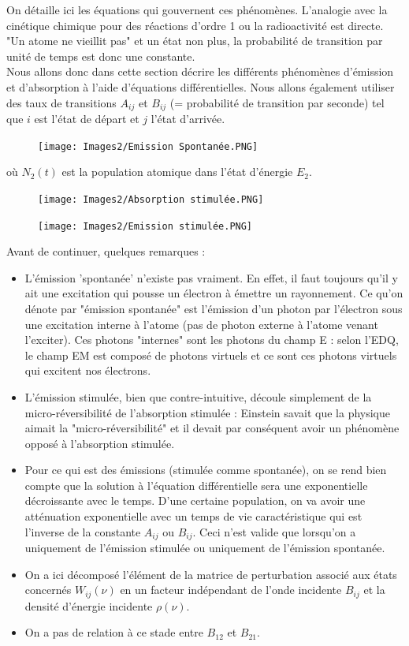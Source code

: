 On détaille ici les équations qui gouvernent ces phénomènes. L'analogie avec la cinétique chimique pour des réactions d'ordre 1 ou la radioactivité est directe. "Un atome ne vieillit pas" et un état non plus, la probabilité de transition par unité de temps est donc une constante.\\
Nous allons donc dans cette section décrire les différents phénomènes d'émission et d'absorption à l'aide d'équations différentielles. Nous allons également utiliser des taux de transitions $A_{ij}$ et $B_{ij}$ (= probabilité de transition par seconde) tel que $i$ est l'état de départ et $j$ l'état d'arrivée.
\begin{figure}[tph]
    \centering
    \texttt{[image: Images2/Emission Spontanée.PNG]}
    \label{fig:emission_spont}
\end{figure}
où $N_2(t)$ est la population atomique dans l'état d'énergie $E_2$.
\begin{figure}[tph]
    \texttt{[image: Images2/Absorption stimulée.PNG]}
    \label{fig:absorb_stimul}
\end{figure}
\begin{figure}[tph]
    \texttt{[image: Images2/Emission stimulée.PNG]}
    \label{fig:emission_stimul}
\end{figure}
Avant de continuer, quelques remarques :
\begin{itemize}[label=$\bullet$]
    \item L'émission 'spontanée' n'existe pas vraiment. En effet, il faut toujours qu'il y ait une excitation qui pousse un électron à émettre un rayonnement. Ce qu'on dénote par "émission spontanée" est l'émission d'un photon par l'électron sous une excitation interne à l'atome (pas de photon externe à l'atome venant l'exciter). Ces photons "internes" sont les photons du champ E : selon l'EDQ, le champ EM est composé de photons virtuels et ce sont ces photons virtuels qui excitent nos électrons.
    \item L'émission stimulée, bien que contre-intuitive, découle simplement de la micro-réversibilité de l'absorption stimulée : Einstein savait que la physique aimait la "micro-réversibilité" et il devait par conséquent avoir un phénomène opposé à l'absorption stimulée.
    \item Pour ce qui est des émissions (stimulée comme spontanée), on se rend bien compte que la solution à l'équation différentielle sera une exponentielle décroissante avec le temps. D'une certaine population, on va avoir une atténuation exponentielle avec un temps de vie caractéristique qui est l'inverse de la constante $A_{ij}$ ou $B_{ij}$. Ceci n'est valide que lorsqu'on a uniquement de l'émission stimulée ou uniquement de l'émission spontanée.
    \item On a ici décomposé l'élément de la matrice de perturbation associé aux états concernés $W_{ij}(\nu)$ en un facteur indépendant de l'onde incidente $B_{ij}$ et la densité d'énergie incidente $\rho(\nu)$.
    \item On a pas de relation à ce stade entre $B_{12}$ et $B_{21}$.
\end{itemize}
